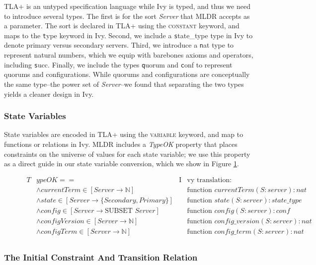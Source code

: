 \documentclass[12pt]{article}
\newcommand{\tla}[1]{{\small\scshape #1}}
\newcommand{\ivy}[1]{{\small\texttt #1}}
\begin{document}
TLA+ is an untyped specification language while Ivy is typed, and thus we need to introduce several types.  The first is for the sort \textit{Server} that MLDR accepts as a parameter.  The sort is declared in TLA+ using the \tla{constant} keyword, and maps to the \ivy{type} keyword in Ivy.  Second, we include a \ivy{state\_type} type in Ivy to denote primary versus secondary servers.  Third, we introduce a \ivy{nat} type to represent natural numbers, which we equip with barebones axioms and operators, including \ivy{succ}.  Finally, we include the types \ivy{quorum} and \ivy{conf} to represent quorums and configurations.  While quorums and configurations are conceptually the same type--the power set of \textit{Server}--we found that separating the two types yields a cleaner design in Ivy.

\subsubsection{State Variables}

State variables are encoded in TLA+ using the \tla{variable} keyword, and map to functions or relations in Ivy.  MLDR includes a \textit{TypeOK} property that places constraints on the universe of values for each state variable; we use this property as a direct guide in our state variable conversion, which we show in Figure \ref{fig:statevar-map}.

\begin{figure}
  \label{fig:statevar-map}
  \begin{align*}
    T&ypeOK ==& \text{I}&\text{vy translation:}\\
      &\land currentTerm \in [Server \to \mathbb{N}]& &\text{function } currentTerm(S:server) : nat\\
      &\land state \in [Server \to \{Secondary, Primary\}]& &\text{function } state(S:server) : state\_type\\
      &\land config \in [Server \to \text{SUBSET } Server]& &\text{function } config(S:server) : conf\\
      &\land configVersion \in [Server \to \mathbb{N}]& &\text{function } config\_version(S:server) : nat\\
      &\land configTerm \in [Server \to \mathbb{N}]& &\text{function } config\_term(S:server) : nat\\
  \end{align*}
\end{figure}

\subsubsection{The Initial Constraint And Transition Relation}
\end{document}
